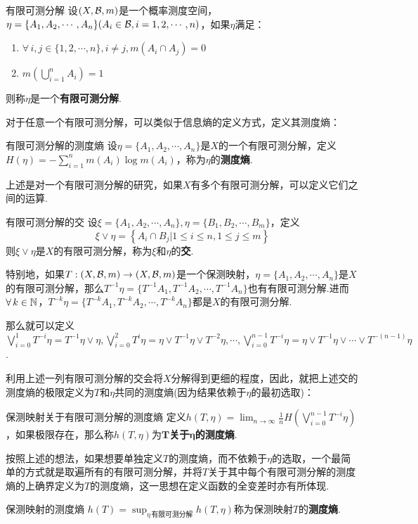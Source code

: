 \begin{definition}{有限可测分解}
    设$(X,\mathcal{B},m)$是一个概率测度空间，$\eta=\{A_1,A_2,\cdots,A_n\}(A_i\in\mathcal{B},i=1,2,\cdots,n)$，如果$\eta$满足：
    \begin{enumerate}[(1)]
        \item $\forall\, i,j\in\{1,2,\cdots,n\},i\neq j,m\left(A_i\cap A_j\right)=0$
        \item $m\left(\bigcup_{i=1}^n A_i\right)=1$
    \end{enumerate}
    则称$\eta$是一个\textbf{有限可测分解}.
\end{definition}

对于任意一个有限可测分解，可以类似于信息熵的定义方式，定义其测度熵：
\begin{definition}{有限可测分解的测度熵}
    设$\eta=\{A_1,A_2,\cdots,A_n\}$是$X$的一个有限可测分解，定义$H(\eta)=-\sum_{i=1}^n m(A_i)\log m(A_i)$，称为$\eta$的\textbf{测度熵}.
\end{definition}

上述是对一个有限可测分解的研究，如果$X$有多个有限可测分解，可以定义它们之间的运算.
\begin{definition}{有限可测分解的交}
    设$\xi=\{A_1,A_2,\cdots,A_n\},\eta=\{B_1,B_2,\cdots,B_m\}$，定义
    $$\xi\vee\eta=\left\{A_i\cap B_j\left|1\leq i\leq n,1\leq j\leq m\right.\right\}$$
    则$\xi\vee\eta$是$X$的有限可测分解，称为$\xi$和$\eta$的\textbf{交}.
\end{definition}

特别地，如果$T:(X,\mathcal{B},m)\to(X,\mathcal{B},m)$是一个保测映射，$\eta=\{A_1,A_2,\cdots,A_n\}$是$X$的有限可测分解，那么$T^{-1}\eta=\{T^{-1}A_1,T^{-1}A_2,\cdots,T^{-1}A_n\}$也有有限可测分解.进而$\forall\, k\in\mathbb{N}$，$T^{-k}\eta=\{T^{-k}A_1,T^{-k}A_2,\cdots,T^{-k}A_n\}$都是$X$的有限可测分解.\par
那么就可以定义$\bigvee_{i=0}^1T^{-i}\eta=T^{-1}\eta\vee\eta,\bigvee_{i=0}^2T^{i}\eta=\eta\vee T^{-1}\eta\vee T^{-2}\eta,\cdots,\bigvee_{i=0}^{n-1}T^{-i}\eta=\eta\vee T^{-1}\eta\vee\cdots\vee T^{-(n-1)}\eta$.\par
利用上述一列有限可测分解的交会将$X$分解得到更细的程度，因此，就把上述交的测度熵的极限定义为$T$和$\eta$共同的测度熵(因为结果依赖于$\eta$的最初选取)：
\begin{definition}{保测映射关于有限可测分解的测度熵}
    定义$h(T,\eta)=\lim_{n\to\infty}\frac{1}{n}H\left(\bigvee_{i=0}^{n-1}T^{-i}\eta\right)$，如果极限存在，那么称$h(T,\eta)$为\textbf{$\bm{T}$关于$\bm{\eta}$的测度熵}.
\end{definition}
按照上述的想法，如果想要单独定义$T$的测度熵，而不依赖于$\eta$的选取，一个最简单的方式就是取遍所有的有限可测分解，并将$T$关于其中每个有限可测分解的测度熵的上确界定义为$T$的测度熵，这一思想在定义函数的全变差时亦有所体现.\par
\begin{definition}{保测映射的测度熵}
    $h(T)=\sup_{\eta\,\text{有限可测分解}} h(T,\eta)$称为保测映射$T$的\textbf{测度熵}.
\end{definition}

